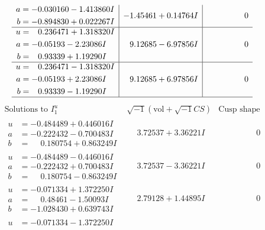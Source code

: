 \documentclass[1p]{elsarticle_modified}
\theoremstyle{definition}
\newcommand{\I}{\sqrt{-1}}
\begin{document}
$$\begin{array}{c|c|c}
\begin{aligned}
a &= -0.030160 - 1.413860 I \\
b &= -0.894830 + 0.022267 I\end{aligned}
 & -1.45461 + 0.14764 I & \phantom{-0.000000 } 0 \\ \hline\begin{aligned}
u &= \phantom{-}0.236471 + 1.318320 I \\
a &= -0.05193 - 2.23086 I \\
b &= \phantom{-}0.93339 + 1.19290 I\end{aligned}
 & \phantom{-}9.12685 - 6.97856 I & \phantom{-0.000000 } 0 \\ \hline\begin{aligned}
u &= \phantom{-}0.236471 - 1.318320 I \\
a &= -0.05193 + 2.23086 I \\
b &= \phantom{-}0.93339 - 1.19290 I\end{aligned}
 & \phantom{-}9.12685 + 6.97856 I & \phantom{-0.000000 } 0\\
 \hline 
 \end{array}$$\newpage$$\begin{array}{c|c|c}  
\text{Solutions to }I^u_{1}& \I (\text{vol} + \sqrt{-1}CS) & \text{Cusp shape}\\
 \hline 
\begin{aligned}
u &= -0.484489 + 0.446016 I \\
a &= -0.222432 - 0.700483 I \\
b &= \phantom{-}0.180754 + 0.863249 I\end{aligned}
 & \phantom{-}3.72537 + 3.36221 I & \phantom{-0.000000 } 0 \\ \hline\begin{aligned}
u &= -0.484489 - 0.446016 I \\
a &= -0.222432 + 0.700483 I \\
b &= \phantom{-}0.180754 - 0.863249 I\end{aligned}
 & \phantom{-}3.72537 - 3.36221 I & \phantom{-0.000000 } 0 \\ \hline\begin{aligned}
u &= -0.071334 + 1.372250 I \\
a &= \phantom{-}0.48461 - 1.50093 I \\
b &= -1.028430 + 0.639743 I\end{aligned}
 & \phantom{-}2.79128 + 1.44895 I & \phantom{-0.000000 } 0 \\ \hline\begin{aligned}
u &= -0.071334 - 1.372250 I \\

\end{aligned}
\end{array}$$
\end{document}
